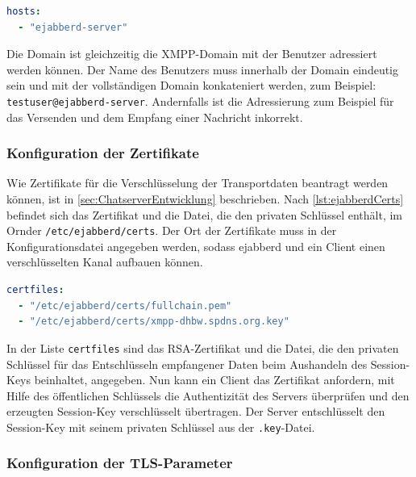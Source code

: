 \documentclass[a4paper,titlepage,halfparskip,12pt]{scrreprt}
\begin{document}
\begin{onehalfspacing}
\bigskip

\begin{lstlisting}[language=yaml, caption={Konfiguration der Domains},label={lst:configHosts}]
hosts:
  - "ejabberd-server"
\end{lstlisting}

Die Domain ist gleichzeitig die \ac{XMPP}-Domain mit der Benutzer adressiert werden können. Der Name des Benutzers muss innerhalb der Domain eindeutig sein und mit der vollständigen Domain konkateniert werden, zum Beispiel: \texttt{testuser@ejabberd-server}. Andernfalls ist die Adressierung zum Beispiel für das Versenden und dem Empfang einer Nachricht inkorrekt.

\subsubsection*{Konfiguration der Zertifikate}

Wie Zertifikate für die Verschlüsselung der Transportdaten beantragt werden können, ist in \autoref{sec:ChatserverEntwicklung} beschrieben. Nach \autoref{lst:ejabberdCerts} befindet sich das Zertifikat und die Datei, die den privaten Schlüssel enthält, im Ornder \texttt{/etc/ejabberd/certs}. Der Ort der Zertifikate muss in der Konfigurationsdatei angegeben werden, sodass ejabberd und ein Client einen verschlüsselten Kanal aufbauen können.

\bigskip

\begin{lstlisting}[language=yaml, caption={Konfiguration der Zertifikate}]
certfiles:
  - "/etc/ejabberd/certs/fullchain.pem"
  - "/etc/ejabberd/certs/xmpp-dhbw.spdns.org.key"
\end{lstlisting}

In der Liste \texttt{certfiles} sind das \ac{RSA}-Zertifikat und die Datei, die den privaten Schlüssel für das Entschlüsseln empfangener Daten beim Aushandeln des Session-Keys beinhaltet, angegeben. Nun kann ein Client das Zertifikat anfordern, mit Hilfe des öffentlichen Schlüssels die Authentizität des Servers überprüfen und den erzeugten Session-Key verschlüsselt übertragen. Der Server entschlüsselt den Session-Key mit seinem privaten Schlüssel aus der \texttt{.key}-Datei.

\subsubsection*{Konfiguration der \ac{TLS}-Parameter}


\end{onehalfspacing}
\end{document}

